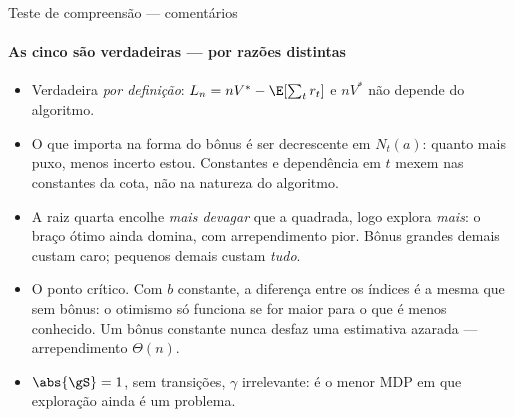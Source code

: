 \documentclass[aspectratio=169, 11pt]{beamer}
\begin{document}
\begin{frame}{Teste de compreensão --- comentários}
  \framesubtitle{As cinco são verdadeiras --- por razões distintas}
  {\footnotesize
  \begin{itemize}\setlength{\itemsep}{0.5ex}
    \item[\textbf{1.}] Verdadeira \emph{por definição}: $L_n = nV^{*} -
          \E[\sum_t r_t]$ e $nV^{*}$ não depende do algoritmo.
    \item[\textbf{2.}] O que importa na forma do bônus é ser \alert{decrescente
          em $N_t(a)$}: quanto mais puxo, menos incerto estou. Constantes e
          dependência em $t$ mexem nas constantes da cota, não na natureza do
          algoritmo.
    \item[\textbf{3.}] A raiz quarta encolhe \emph{mais devagar} que a
          quadrada, logo explora \emph{mais}: o braço ótimo ainda domina, com
          arrependimento pior. Bônus grandes demais custam caro; pequenos
          demais custam \emph{tudo}.
    \item[\textbf{4.}] O ponto crítico. Com $b$ constante, a diferença entre os
          índices é a mesma que sem bônus: o otimismo só funciona se for
          \alert{maior para o que é menos conhecido}. Um bônus constante nunca
          desfaz uma estimativa azarada --- arrependimento $\Theta(n)$.
    \item[\textbf{5.}] $\abs{\gS}=1$, sem transições, $\gamma$ irrelevante:
          é o menor MDP em que exploração ainda é um problema.
  \end{itemize}}
\end{frame}
\end{document}
